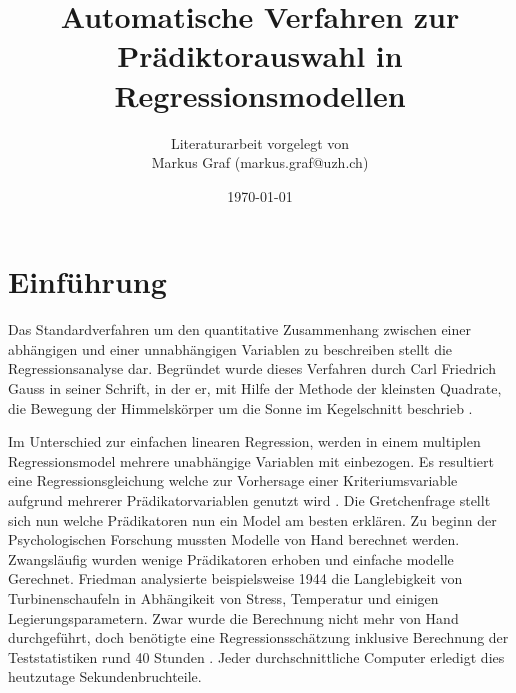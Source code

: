\documentclass[english,12pt,doc]{apa}
\begin{document}
\title{Automatische Verfahren zur Prädiktorauswahl in Regressionsmodellen}
\author{Literaturarbeit vorgelegt von \\ Markus Graf (markus.graf@uzh.ch)}
\date{\today}
\maketitle
\setlength{\parindent}{0pt}
\newpage
\tableofcontents
\newpage
\section{Einführung}
Das Standardverfahren um den quantitative Zusammenhang zwischen einer abhängigen und einer unnabhängigen Variablen zu beschreiben stellt die Regressionsanalyse dar. Begründet wurde dieses Verfahren durch Carl Friedrich Gauss in seiner Schrift, in der er, mit Hilfe der Methode der kleinsten Quadrate, die Bewegung der Himmelskörper um die Sonne im Kegelschnitt beschrieb \cite{gauss1809theoria}. 

Im Unterschied zur einfachen linearen Regression, werden in einem multiplen Regressionsmodel mehrere unabhängige Variablen mit einbezogen. Es resultiert eine Regressionsgleichung welche zur Vorhersage einer Kriteriumsvariable aufgrund mehrerer Prädikatorvariablen genutzt wird  \cite[S. 448]{bortz2011}. 
Die Gretchenfrage stellt sich nun welche Prädikatoren nun ein Model am besten erklären. Zu beginn der Psychologischen Forschung mussten Modelle von Hand berechnet werden. Zwangsläufig wurden wenige Prädikatoren erhoben und einfache modelle Gerechnet. Friedman analysierte beispielsweise 1944 die Langlebigkeit von Turbinenschaufeln in Abhängikeit von Stress, Temperatur und einigen Legierungsparametern. Zwar wurde die Berechnung nicht mehr von Hand durchgeführt, doch benötigte eine Regressionsschätzung inklusive Berechnung der Teststatistiken rund 40 Stunden \cite[p.2]{armstrong2011illusions}. Jeder durchschnittliche Computer erledigt dies heutzutage Sekundenbruchteile. 
\end{document}
